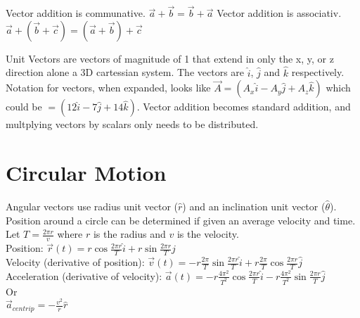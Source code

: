 \documentclass{article}
\begin{document}

Vector addition is communative. $\vec{a} + \vec{b} = \vec{b} + \vec{a}$
Vector addition is associativ. $\vec{a} + (\vec{b} + \vec{c}) = (\vec{a} + \vec{b}) + \vec{c}$

Unit Vectors are vectors of magnitude of 1 that extend in only the x, y, or z direction alone a 3D cartessian system. The vectors are $\hat{i}$, $\hat{j}$ and $\hat{k}$ respectively. Notation for vectors, when expanded, looks like $\vec{A} = (A_x\hat{i} - A_y\hat{j} + A_z\hat{k})$ which could be $=(12\hat{i} - 7\hat{j} + 14\hat{k})$. Vector addition becomes standard addition, and multplying vectors by scalars only needs to be distributed.

\section{Circular Motion}
Angular vectors use radius unit vector ($\hat{r}$) and an inclination unit vector ($\hat{\theta}$). Position around a circle can be determined if given an average velocity and time.\\
Let $T = \frac{2\pi r}{v}$ where $r$ is the radius and $v$ is the velocity.\\
Position: $\vec{r}(t) = r\cos{\frac{2\pi r}{T}}\hat{i} + r\sin{\frac{2\pi r}{T}}\hat{j}$\\
Velocity (derivative of position): $\vec{v}(t) = -r\frac{2\pi}{T}\sin{\frac{2\pi r}{T}}\hat{i} + r\frac{2\pi}{T}\cos{\frac{2\pi r}{T}}\hat{j}$\\
Acceleration (derivative of velocity): $\vec{a}(t) = -r\frac{4\pi^2}{T^2}\cos{\frac{2\pi r}{T}}\hat{i} - r\frac{4\pi^2}{T^2}\sin{\frac{2\pi r}{T}}\hat{j}$\\
Or\\
$\vec{a}_{centrip} = -\frac{v^2}{r}\hat{r}$
\end{document}

